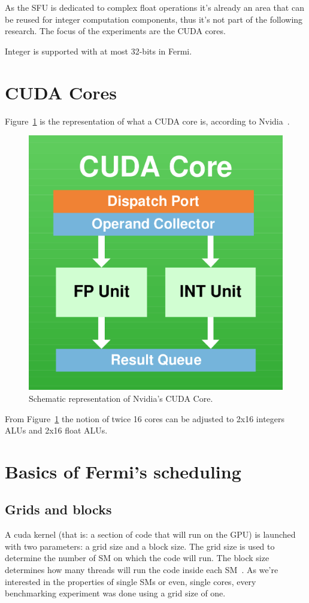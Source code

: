 \documentclass{report}
\begin{document}
    As the SFU is dedicated to complex float operations it's already an area
    that can be reused for integer computation components, thus it's not part
    of the following research. The focus of the experiments are the CUDA cores.
    
    Integer is supported with at most 32-bits in Fermi.

    \section{CUDA Cores}
    Figure~\ref{fig:CUDACore} is the representation of what a CUDA core is,
    according to Nvidia~\cite{fermiwhitepap}.
    
    \begin{figure}[H]
    \centering
        \includegraphics[width=0.5\linewidth]{pictures/CUDACore}
        \captionsetup{justification=centering}
        \caption{Schematic representation of Nvidia's CUDA Core.}
        \label{fig:CUDACore}
    \end{figure}
    
    From Figure~\ref{fig:CUDACore} the notion of twice 16 cores can be
    adjusted to 2x16 integers ALUs and 2x16 float ALUs.

    \section{Basics of Fermi's scheduling}
        \subsection{Grids and blocks} 
        A cuda kernel (that is: a section of code that will run on the GPU) is
        launched with two parameters: a grid size and a block size. The grid 
        size is used to determine the number of SM on which the code will run.
        The block size determines how many threads will run the code inside each
        SM~\cite{cudaprog}. As we're interested in the properties of single SMs or even, single
        cores, every benchmarking experiment was done using a grid size of one.
\end{document}
